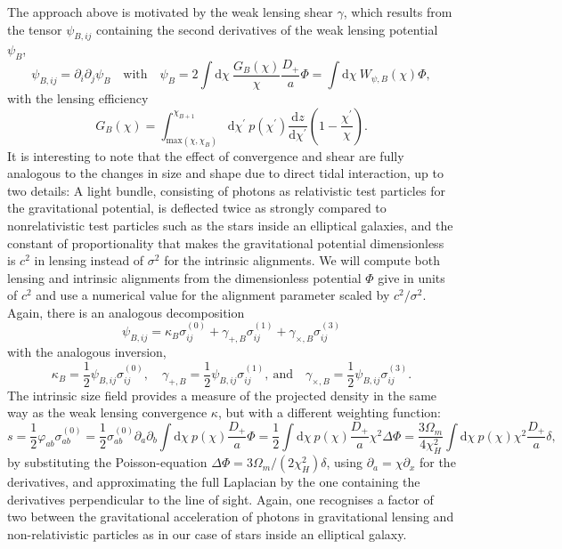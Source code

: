\documentclass[a4paper,fleqn,usenatbib]{mnras}
\newcommand{\dd}{\mathrm{d}}
\begin{document}
The approach above is motivated by the weak lensing shear $\gamma$, which results from the tensor $\psi_{B,ij}$ containing the second derivatives of the weak lensing potential $\psi_B$,
\begin{equation}
\psi_{B,ij} = \partial_i\partial_j\psi_B
\quad\mathrm{with}\quad
\psi_B = 2\int\dd\chi\:\frac{G_B(\chi)}{\chi}\frac{D_+}{a}\Phi = \int\dd\chi\:W_{\psi,B}(\chi)\Phi,
\end{equation}
with the lensing efficiency
\begin{equation}
G_B(\chi) = \int_{\mathrm{max}(\chi,\chi_B)}^{\chi_{B+1}}\dd\chi^\prime\:p(\chi^\prime)\frac{\dd z}{\dd\chi^\prime}\left(1-\frac{\chi^\prime}{\chi}\right).
\end{equation}
It is interesting to note that the effect of convergence and shear are fully analogous to the changes in size and shape due to direct tidal interaction, up to two details: A light bundle, consisting of photons as relativistic test particles for the gravitational potential, is deflected twice as strongly compared to nonrelativistic test particles such as the stars inside an elliptical galaxies, and the constant of proportionality that makes the gravitational potential dimensionless is $c^2$ in lensing instead of $\sigma^2$ for the intrinsic alignments. We will compute both lensing and intrinsic alignments from the dimensionless potential $\Phi$ give in units of $c^2$ and use a numerical value for the alignment parameter scaled by $c^2/\sigma^2$. Again, there is an analogous decomposition
\begin{equation}
\psi_{B,ij} = \kappa_B\sigma^{(0)}_{ij} + \gamma_{+,B}\sigma^{(1)}_{ij} +\gamma_{\times,B}\sigma^{(3)}_{ij}
\end{equation}
with the analogous inversion,
\begin{equation}
\kappa_B = \frac{1}{2}\psi_{B,ij}\sigma^{(0)}_{ij},
\quad
\gamma_{+,B} = \frac{1}{2}\psi_{B,ij}\sigma^{(1)}_{ij},
\mathrm{~and}\quad
\gamma_{\times,B} = \frac{1}{2}\psi_{B,ij}\sigma^{(3)}_{ij}.
\end{equation}
The intrinsic size field provides a measure of the projected density in the same way as the weak lensing convergence $\kappa$, but with a different weighting function:
\begin{equation}
s = 
\frac{1}{2}\varphi_{ab}\sigma^{(0)}_{ab} = 
\frac{1}{2}\sigma^{(0)}_{ab}\partial_a\partial_b\int\dd\chi\: p(\chi)\frac{D_+}{a}\Phi = 
\frac{1}{2}\int\dd\chi\:p(\chi)\frac{D_+}{a}\chi^2\Delta\Phi = 
\frac{3\Omega_m}{4\chi_H^2}\int\dd\chi\:p(\chi)\chi^2 \frac{D_+}{a}\delta,
\end{equation}
by substituting the Poisson-equation $\Delta\Phi = 3\Omega_m/(2\chi_H^2)\delta$, using $\partial_a = \chi\partial_x$ for the derivatives, and approximating the full Laplacian by the one containing the derivatives perpendicular to the line of sight. Again, one recognises a factor of two between the gravitational acceleration of photons in gravitational lensing and non-relativistic particles as in our case of stars inside an elliptical galaxy.
\end{document}
